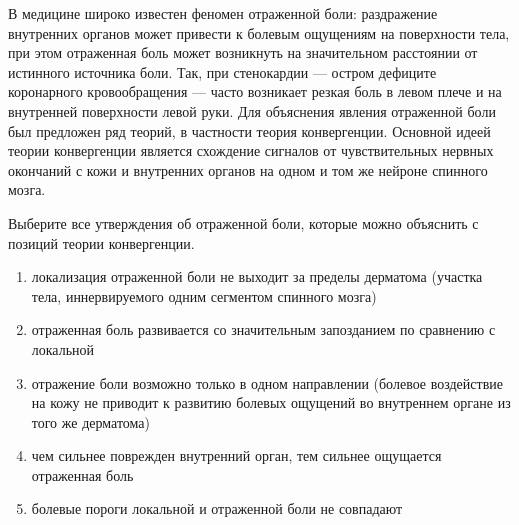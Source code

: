 
В
медицине широко известен феномен отраженной боли: раздражение внутренних
органов может привести к болевым ощущениям на поверхности тела, при этом
отраженная боль может возникнуть на значительном расстоянии от истинного
источника боли. Так, при стенокардии — остром дефиците коронарного кровообращения
— часто возникает резкая боль в левом плече и на внутренней поверхности левой
руки. Для объяснения явления отраженной боли был предложен ряд теорий, в
частности теория конвергенции. Основной идеей теории конвергенции является
схождение сигналов от чувствительных нервных окончаний с кожи и внутренних
органов на одном и том же нейроне спинного мозга.

Выберите все утверждения об отраженной боли,
которые можно объяснить с позиций теории конвергенции.

\begin{enumerate}
    \item локализация отраженной боли не выходит за пределы дерматома (участка тела, иннервируемого одним сегментом спинного мозга)
    \item отраженная боль развивается со значительным запозданием по сравнению с локальной
    \item отражение боли возможно только в одном направлении (болевое воздействие на кожу не приводит к развитию болевых ощущений во внутреннем органе из того же дерматома)
    \item чем сильнее поврежден внутренний орган, тем сильнее ощущается отраженная боль
    \item болевые пороги локальной и отраженной боли не совпадают
\end{enumerate}



